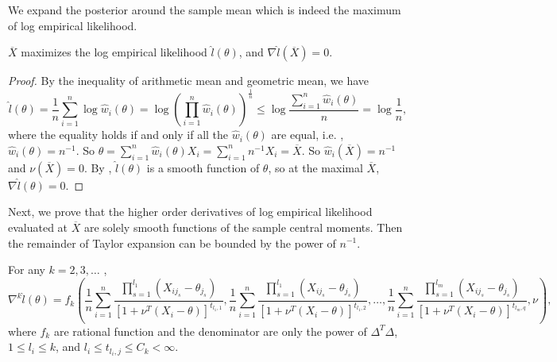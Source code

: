 We expand the posterior around the sample mean which is indeed the
maximum of log empirical likelihood. 
\begin{lem}
\label{lem:mean-max-el}$\overline{X}$ maximizes the log empirical
likelihood $\hat{l}\left(\theta\right)$, and $\nabla\hat{l}\left(\overline{X}\right)=0$. \end{lem}
\begin{proof}
By the inequality of arithmetic mean and geometric mean, we have 
\begin{equation}
\hat{l}\left(\theta\right)=\frac{1}{n}\sum_{i=1}^{n}\log\hat{w}_{i}\left(\theta\right)=\log\left(\prod_{i=1}^{n}\hat{w}_{i}\left(\theta\right)\right)^{\frac{1}{n}}\le\log\frac{\sum_{i=1}^{n}\hat{w}_{i}\left(\theta\right)}{n}=\log\frac{1}{n},\label{eq:bound-log-el}
\end{equation}
where the equality holds if and only if all the $\hat{w}_{i}\left(\theta\right)$
are equal, i.e. , $\hat{w}_{i}\left(\theta\right)=n^{-1}.$ So $\theta=\sum_{i=1}^{n}\hat{w}_{i}\left(\theta\right)X_{i}=\sum_{i=1}^{n}n^{-1}X_{i}=\overline{X}$.
So $\hat{w}_{i}\left(\overline{X}\right)=n^{-1}$ and $\nu\left(\overline{X}\right)=0$.
By , $\hat{l}\left(\theta\right)$
is a smooth function of $\theta$, so at the maximal $\overline{X}$,
$\nabla\hat{l}\left(\theta\right)=0$. 
\end{proof}
Next, we prove that the higher order derivatives of log empirical
likelihood evaluated at $\overline{X}$ are solely smooth functions
of the sample central moments. Then the remainder of Taylor expansion
can be bounded by the power of $n^{-1}$. 
\begin{lem}
\label{lem:control-higher-order-derivative-l}For any $k=2,3,\ldots$
, 
\[
\nabla^{k}\hat{l}\left(\theta\right)=f_{k}\left(\frac{1}{n}\sum_{i=1}^{n}\frac{\prod_{s=1}^{l_{1}}\left(X_{ij_{s}}-\theta_{j_{s}}\right)}{\left[1+\nu^{T}\left(X_{i}-\theta\right)\right]^{t_{l_{1},1}}},\frac{1}{n}\sum_{i=1}^{n}\frac{\prod_{s=1}^{l_{1}}\left(X_{ij_{s}}-\theta_{j_{s}}\right)}{\left[1+\nu^{T}\left(X_{i}-\theta\right)\right]^{t_{l_{1},2}}},\ldots,\frac{1}{n}\sum_{i=1}^{n}\frac{\prod_{s=1}^{l_{m}}\left(X_{ij_{s}}-\theta_{j_{s}}\right)}{\left[1+\nu^{T}\left(X_{i}-\theta\right)\right]^{t_{l_{m},q}}},\nu\right),
\]
where $f_{k}$ are rational function and the denominator are only
the power of $\Delta^{T}\Delta$, $1\le l_{i}\le k$, and $l_{i}\le t_{l_{i},j}\le C_{k}<\infty$. \end{lem}
